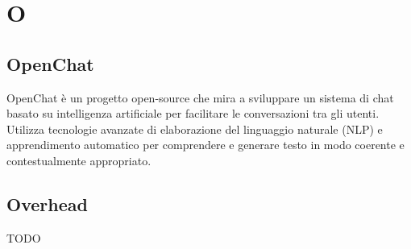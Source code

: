 \section{O}

\vspace{2em}
\subsection*{OpenChat}
OpenChat è un progetto open-source che mira a sviluppare un sistema di chat basato su intelligenza artificiale per facilitare le conversazioni tra gli utenti. Utilizza tecnologie avanzate di elaborazione del linguaggio naturale (NLP) e apprendimento automatico per comprendere e generare testo in modo coerente e contestualmente appropriato.

\vspace{2em}
\subsection*{Overhead}
TODO
